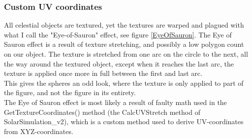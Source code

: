 \subsubsection{Custom UV coordinates}
All celestial objects are textured, yet the textures are warped and plagued with what I call the "Eye-of-Sauron" effect, see figure \ref{EyeOfSauron}. The Eye of Sauron effect is a result of texture stretching, and possibly a low polygon count on our object. The texture is stretched from one arc on the circle to the next, all the way around the textured object, except when it reaches the last arc, the texture is applied once more in full between the first and last arc.\\
This gives the spheres an odd look, where the texture is only applied to part of the figure, and not the figure in its entirety.\\
The Eye of Sauron effect is most likely a result of faulty math used in the GetTextureCoordinates() method (the CalcUVStretch method of SolarSimulation\_v2), which is a custom method used to derive UV-coordinates from XYZ-coordinates.
